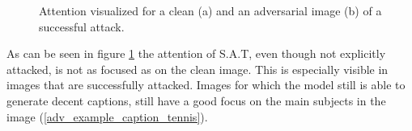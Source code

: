 \begin{figure}[h]
    \centering
    \vspace{\floatsep}
    \caption{Attention visualized for a clean (a) and an adversarial image (b) of a successful attack.}
    \label{adv_example_caption}
\end{figure}


As can be seen in figure \ref{adv_example_caption} the attention of S.A.T, even though not explicitly attacked, is not as focused as on the clean image. This is especially visible in images that are successfully attacked. Images for which the model still is able to generate decent captions, still have a good focus on the main subjects in the image (\ref{adv_example_caption_tennis}).



